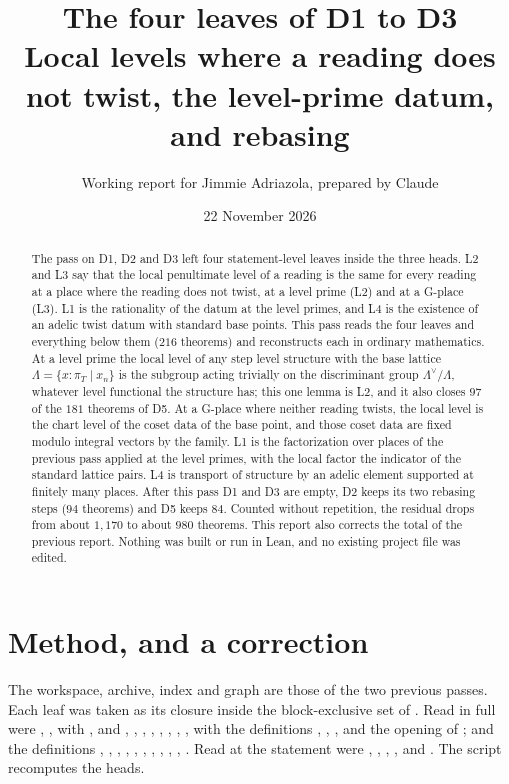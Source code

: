 \documentclass[11pt]{article}
\title{The four leaves of D1 to D3\\ Local levels where a reading does not twist, the level-prime datum, and rebasing}
\author{Working report for Jimmie Adriazola, prepared by Claude}
\date{22 November 2026}
\newcommand{\Lb}{\Lambda}
\newcommand{\Lbd}{\Lambda^{\vee}}
\theoremstyle{definition}
\theoremstyle{remark}
\begin{document}
\maketitle

\begin{abstract}
The pass on D1, D2 and D3 left four statement-level leaves inside the three heads. L2 and L3 say that the local penultimate level of a reading is the same for every reading at a place where the reading does not twist, at a level prime (L2) and at a G-place (L3). L1 is the rationality of the datum at the level primes, and L4 is the existence of an adelic twist datum with standard base points. This pass reads the four leaves and everything below them ($216$ theorems) and reconstructs each in ordinary mathematics. At a level prime the local level of any step level structure with the base lattice $\Lb=\{x:\pi_T\mid x_n\}$ is the subgroup acting trivially on the discriminant group $\Lbd/\Lb$, whatever level functional the structure has; this one lemma is L2, and it also closes $97$ of the $181$ theorems of D5. At a G-place where neither reading twists, the local level is the chart level of the coset data of the base point, and those coset data are fixed modulo integral vectors by the family. L1 is the factorization over places of the previous pass applied at the level primes, with the local factor the indicator of the standard lattice pairs. L4 is transport of structure by an adelic element supported at finitely many places. After this pass D1 and D3 are empty, D2 keeps its two rebasing steps ($94$ theorems) and D5 keeps $84$. Counted without repetition, the residual drops from about $1{,}170$ to about $980$ theorems. This report also corrects the total of the previous report. Nothing was built or run in Lean, and no existing project file was edited.
\end{abstract}

\tableofcontents

\section{Method, and a correction}

The workspace, archive, index and graph are those of the two previous passes. Each leaf was taken as its closure inside the block-exclusive set of . Read in full were , ,  with ,  and , , , , , , , ,  with the definitions , , , and the opening of ; and the definitions , , , , , , , , , , . Read at the statement were , , , ,  and . The script  recomputes the heads.
\end{document}
